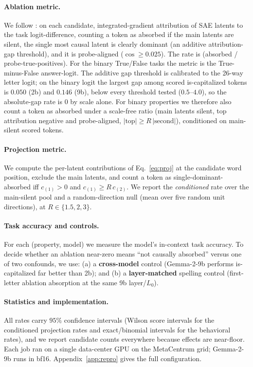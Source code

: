 \documentclass[11pt]{article}
\newcommand{\iscap}{\textsf{is-capitalized}}
\theoremstyle{definition}
\begin{document}
\paragraph{Ablation metric.}
We follow \citet{chanin2024absorption}: on each candidate, integrated-gradient attribution of SAE latents to
the task logit-difference, counting a token as absorbed if the main latents are silent, the single
most causal latent is clearly dominant (an additive attribution-gap threshold), and it is probe-aligned
($\cos\ge 0.025$). The rate is (absorbed / probe-true-positives). For the binary True/False tasks the metric
is the True-minus-False answer-logit. The additive gap threshold is calibrated to the 26-way letter logit; on
the binary logit the largest gap among scored \iscap{} tokens is $0.050$ (2b) and $0.146$ (9b), below every
threshold tested ($0.5$--$4.0$), so the absolute-gap rate is $0$ by scale alone. For binary properties we
therefore also count a token as absorbed under a scale-free ratio (main latents silent, top attribution
negative and probe-aligned, $|\text{top}|\ge R\,|\text{second}|$), conditioned on main-silent scored tokens.

\paragraph{Projection metric.}
We compute the per-latent contributions of Eq.~\eqref{eq:proj} at the candidate word position, exclude the
main latents, and count a token as single-dominant-absorbed iff $c_{(1)}>0$ and $c_{(1)}\ge R\,c_{(2)}$. We
report the \emph{conditioned} rate over the main-silent pool and a random-direction null (mean over five
random unit directions), at $R\in\{1.5,2,3\}$.

\paragraph{Task accuracy and controls.}
For each (property, model) we measure the model's in-context task accuracy. To decide whether an ablation
near-zero means ``not causally absorbed'' versus one of two confounds, we use: (a) a \textbf{cross-model} control
(Gemma-2-9b performs \iscap{} far better than 2b); and (b) a \textbf{layer-matched} spelling control
(first-letter ablation absorption at the same 9b layer/$L_0$).

\paragraph{Statistics and implementation.}
All rates carry $95\%$ confidence intervals (Wilson score intervals for the conditioned projection rates
and exact/binomial intervals for the behavioral rates), and we report candidate counts everywhere because
effects are near-floor. Each job ran on a single data-center GPU
on the MetaCentrum grid; Gemma-2-9b runs in bf16. Appendix~\ref{app:repro} gives the full configuration.
\end{document}
